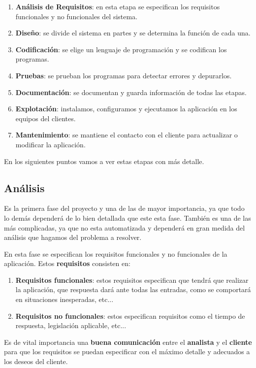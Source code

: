 \begin{enumerate}
    \item \textbf{Análisis de Requisitos}: en esta etapa se especifican los requisitos funcionales y no funcionales del sistema.
    \item \textbf{Diseño}: se divide el sistema en partes y se determina la función de cada una.
    \item \textbf{Codificación}: se elige un lenguaje de programación y se codifican los programas.
    \item \textbf{Pruebas}: se prueban los programas para detectar errores y depurarlos.
    \item \textbf{Documentación}: se documentan y guarda información de todas las etapas.
    \item \textbf{Explotación}: instalamos, configuramos y ejecutamos la aplicación en los equipos del clientes.
    \item \textbf{Mantenimiento}: se mantiene el contacto con el cliente para actualizar o modificar la aplicación.
\end{enumerate}

En los siguientes puntos vamos a ver estas etapas con más detalle.

\subsection{Análisis}
Es la primera fase del proyecto y una de las de mayor importancia, ya que todo lo demás dependerá de lo bien detallada que este esta fase. También es una de las más complicadas, ya que no esta automatizada y dependerá en gran medida del análisis que hagamos del problema a resolver.

En esta fase se especifican los requisitos funcionales y no funcionales de la aplicación. Estos \textbf{requisitos} consisten en:

\begin{enumerate}
    \item \textbf{Requisitos funcionales}: estos requisitos especifican que tendrá que realizar la aplicación, que respuesta dará ante todas las entradas, como se comportará en situaciones inesperadas, etc...
    \item \textbf{Requisitos no funcionales}: estos especifican requisitos como el tiempo de respuesta, legislación aplicable, etc...
\end{enumerate}

Es de vital importancia una \textbf{buena comunicación} entre el \textbf{analista} y el \textbf{cliente} para que los requisitos se puedan especificar con el máximo detalle y adecuados a los deseos del cliente.

